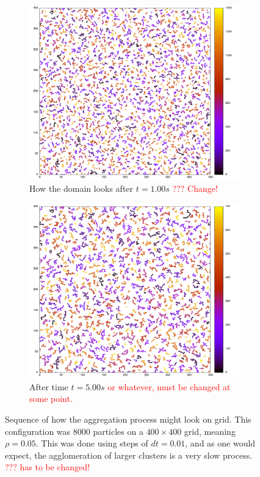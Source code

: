 \begin{figure}[h]
\begin{center}
\begin{subfigure}[t]{0.45\textwidth}
			\label{fig:33}
		\end{subfigure}
		\begin{subfigure}[t]{0.45\textwidth}
		\includegraphics[width = \textwidth]{fig/00100_off.png}
			\caption{How the domain looks after $ t = 1.00 s $ \textcolor{red}{??? Change!}}
			\label{fig:67}
		\end{subfigure}
		\begin{subfigure}[t]{0.45\textwidth}
			\includegraphics[width = \textwidth]{fig/00500_off.png}
			\caption{After time $t = 5.00 s$ \textcolor{red}{or whatever, must be changed at some point.}}
			\label{fig:100}
		\end{subfigure}
		\caption{Sequence of how the aggregation process might look on grid. This configuration was 8000 particles on a $400 \times 400$ grid, meaning $\rho = 0.05$. This was done using steps of $dt = 0.01$, and as one would expect, the agglomeration of larger clusters is a very slow process. \textcolor{red}{??? has to be changed!}}
		\label{fig:arrays}
	\end{center}
\end{figure}



